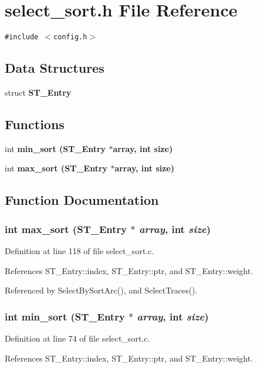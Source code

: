 \section{select\_\-sort.h File Reference}
\label{select__sort_8h}
{\tt \#include $<$config.h$>$}\par
\subsection*{Data Structures}
\begin{CompactItemize}
\item 
struct \bf{ST\_\-Entry}
\end{CompactItemize}
\subsection*{Functions}
\begin{CompactItemize}
\item 
int \bf{min\_\-sort} (\bf{ST\_\-Entry} $\ast$array, int size)
\item 
int \bf{max\_\-sort} (\bf{ST\_\-Entry} $\ast$array, int size)
\end{CompactItemize}


\subsection{Function Documentation}
\subsubsection{\setlength{\rightskip}{0pt plus 5cm}int max\_\-sort (\bf{ST\_\-Entry} $\ast$ {\em array}, int {\em size})}\label{select__sort_8h_48ee672f8284eb9dcd9692a43bb5e681}




Definition at line 118 of file select\_\-sort.c.

References ST\_\-Entry::index, ST\_\-Entry::ptr, and ST\_\-Entry::weight.

Referenced by Select\-By\-Sort\-Arc(), and Select\-Traces().
\subsubsection{\setlength{\rightskip}{0pt plus 5cm}int min\_\-sort (\bf{ST\_\-Entry} $\ast$ {\em array}, int {\em size})}\label{select__sort_8h_b2b5f6c6035cc9195207774147881908}




Definition at line 74 of file select\_\-sort.c.

References ST\_\-Entry::index, ST\_\-Entry::ptr, and ST\_\-Entry::weight.